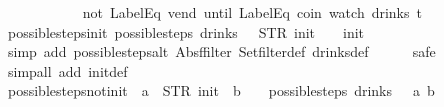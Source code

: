\begin{isabellebody}
{\ \ \ \ \ \ \ \ \ \ {\isacharbar}{\isacharbraceright}{\isachardoublequoteclose}%
}%
\isamarkupfalse%
\ {\isachardoublequoteopen}{\isacharparenleft}not\ {\isacharparenleft}LabelEq\ {\isacharprime}{\isacharprime}vend{\isacharprime}{\isacharprime}{\isacharparenright}\ until\ {\isacharparenleft}LabelEq\ {\isacharprime}{\isacharprime}coin{\isacharprime}{\isacharprime}{\isacharparenright}{\isacharparenright}\ {\isacharparenleft}watch\ drinks\ t{\isacharparenright}{\isachardoublequoteclose}\isanewline
%
\isadelimproof
\ \ %
\endisadelimproof
%
\isatagproof
{}\isamarkupfalse%
%
\endisatagproof
{\isafoldproof}%
%
\isadelimproof
\isanewline
%
\endisadelimproof
\isanewline
{}\isamarkupfalse%
\ possible{\isacharunderscore}steps{\isacharunderscore}init{\isacharcolon}\ {\isachardoublequoteopen}possible{\isacharunderscore}steps\ drinks\ {}\ {\isacharless}{\isachargreater}\ STR\ {\isacharprime}{\isacharprime}init{\isacharprime}{\isacharprime}\ {\isacharbrackleft}{\isacharbrackright}\ {\isacharequal}\ {\isacharbraceleft}{\isacharbar}{\isacharparenleft}{}{\isacharcomma}\ init{\isacharparenright}{\isacharbar}{\isacharbraceright}{\isachardoublequoteclose}\isanewline
%
\isadelimproof
\ \ \ \ %
\endisadelimproof
%
\isatagproof
{}\isamarkupfalse%
\ {\isacharparenleft}simp\ add{\isacharcolon}\ possible{\isacharunderscore}steps{\isacharunderscore}alt\ Abs{\isacharunderscore}ffilter\ Set{\isachardot}filter{\isacharunderscore}def\ drinks{\isacharunderscore}def{\isacharparenright}\isanewline
\ \ \ \ \isamarkupfalse%
\ safe\isanewline
\ \ \isamarkupfalse%
\ {\isacharparenleft}simp{\isacharunderscore}all\ add{\isacharcolon}\ init{\isacharunderscore}def{\isacharparenright}%
\endisatagproof
{\isafoldproof}%
%
\isadelimproof
\isanewline
%
\endisadelimproof
\isanewline
{}\isamarkupfalse%
\ possible{\isacharunderscore}steps{\isacharunderscore}not{\isacharunderscore}init{\isacharcolon}\ {\isachardoublequoteopen}{\isasymnot}\ {\isacharparenleft}a\ {\isacharequal}\ STR\ {\isacharprime}{\isacharprime}init{\isacharprime}{\isacharprime}\ {\isasymand}\ b\ {\isacharequal}\ {\isacharbrackleft}{\isacharbrackright}{\isacharparenright}\ {\isasymLongrightarrow}\ possible{\isacharunderscore}steps\ drinks\ {}\ {\isacharless}{\isachargreater}\ a\ b\ {\isacharequal}\ {\isacharbraceleft}{\isacharbar}{\isacharbar}{\isacharbraceright}{\isachardoublequoteclose}\isanewline
%
\isadelimproof
\ \ \ \ %
\endisadelimproof
%
\isatagproof
{}\isamarkupfalse%

\end{isabellebody}
